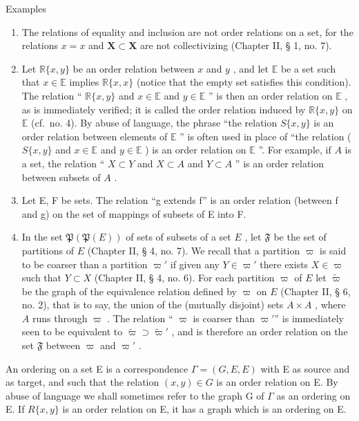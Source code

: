Examples

\begin{enumerate}
\def\labelenumi{(\arabic{enumi})}
\item
  The relations of equality and inclusion are not order relations on a set, for the relations \(x = x\) and \(\mathbf{X} \subset \mathbf{X}\) are not collectivizing (Chapter II, § 1, no. 7).
\item
  Let \(\mathbb{R}\{x, y\}\) be an order relation between \(x\) and \(y\) , and let \(\mathbb{E}\) be a set such that \(x \in \mathbb{E}\) implies \(\mathbb{R}\{x, x\}\) (notice that the empty set satisfies this condition). The relation `` \(\mathbb{R}\{x, y\}\) and \(x \in \mathbb{E}\) and \(y \in \mathbb{E}\) '' is then an order relation on \(\mathbb{E}\) , as is immediately verified; it is called the order relation induced by \(\mathbb{R}\{x, y\}\) on \(\mathbb{E}\) (cf.~no. 4). By abuse of language, the phrase ``the relation \(S\{x, y\}\) is an order relation between elements of \(\mathbb{E}\) '' is often used in place of ``the relation ( \(S\{x, y\}\) and \(x \in \mathbb{E}\) and \(y \in \mathbb{E}\) ) is an order relation on \(\mathbb{E}\) ''. For example, if \(A\) is a set, the relation `` \(X \subset Y\) and \(X \subset A\) and \(Y \subset A\) '' is an order relation between subsets of \(A\) .
\item
  Let E, F be sets. The relation ``g extends f'' is an order relation (between f and g) on the set of mappings of subsets of E into F.
\item
  In the set \(\mathfrak{P}(\mathfrak{P}(E))\) of sets of subsets of a set \(E\) , let \(\mathfrak{F}\) be the set of partitions of \(E\) (Chapter II, § 4, no. 7). We recall that a partition \(\varpi\) is said to be coarser than a partition \(\varpi'\) if given any \(Y \in \varpi'\) there exists \(X \in \varpi\) such that \(Y \subset X\) (Chapter II, § 4, no. 6). For each partition \(\varpi\) of \(E\) let \(\tilde{\varpi}\) be the graph of the equivalence relation defined by \(\varpi\) on \(E\) (Chapter II, § 6, no. 2), that is to say, the union of the (mutually disjoint) sets \(A \times A\) , where \(A\) runs through \(\varpi\) . The relation `` \(\varpi\) is coarser than \(\varpi'\)'' is immediately seen to be equivalent to \(\tilde{\varpi} \supset \tilde{\varpi}'\) , and is therefore an order relation on the set \(\mathfrak{F}\) between \(\varpi\) and \(\varpi'\) .
\end{enumerate}

An ordering on a set E is a correspondence \(\Gamma = (G, E, E)\) with E as source and as target, and such that the relation \((x, y) \in G\) is an order relation on E. By abuse of language we shall sometimes refer to the graph G of \(\Gamma\) as an ordering on E. If \(R\{x, y\}\) is an order relation on E, it has a graph which is an ordering on E.

